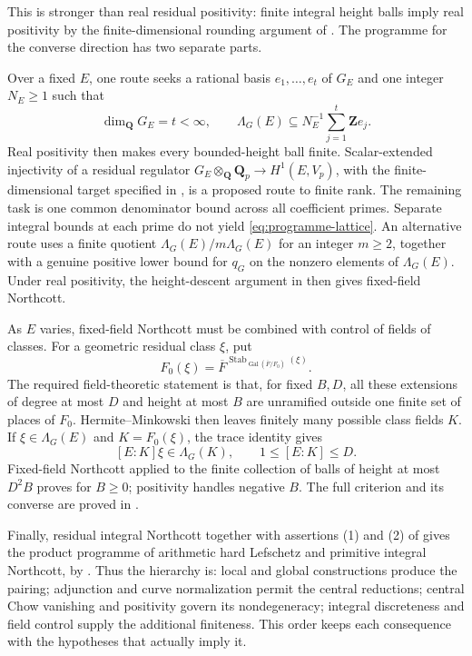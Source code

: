 \documentclass[11pt]{article}
\theoremstyle{definition}
\numberwithin{equation}{section}
\newcommand{\Q}{\mathbf Q}
\begin{document}
This is stronger than real residual positivity: finite integral height balls imply real positivity by the finite-dimensional rounding argument of \cite[Section 5.1]{ArithmeticReductions}. The programme for the converse direction has two separate parts.

Over a fixed $E$, one route seeks a rational basis $e_1,\ldots,e_t$ of $G_E$ and one integer $N_E\ge1$ such that
\begin{equation}\label{eq:programme-lattice}
 \dim_\Q G_E=t<\infty,\qquad
 \Lambda_G(E)\subseteq N_E^{-1}\sum_{j=1}^t\mathbf Z e_j.
\end{equation}
Real positivity then makes every bounded-height ball finite. Scalar-extended injectivity of a residual regulator
$G_E\otimes_\Q\Q_p\to H^1(E,V_p)$, with the finite-dimensional target specified in \cite[Section 3.1]{ArithmeticProgramme}, is a proposed route to finite rank. The remaining task is one common denominator bound across all coefficient primes. Separate integral bounds at each prime do not yield \eqref{eq:programme-lattice}. An alternative route uses a finite quotient $\Lambda_G(E)/m\Lambda_G(E)$ for an integer $m\ge2$, together with a genuine positive lower bound for $q_G$ on the nonzero elements of $\Lambda_G(E)$. Under real positivity, the height-descent argument in \cite[Section 5.4]{ArithmeticReductions} then gives fixed-field Northcott.

As $E$ varies, fixed-field Northcott must be combined with control of fields of classes. For a geometric residual class $\xi$, put
\[
 F_0(\xi)=\overline F^{\operatorname{Stab}_{\operatorname{Gal}(\overline F/F_0)}(\xi)}.
\]
The required field-theoretic statement is that, for fixed $B,D$, all these extensions of degree at most $D$ and height at most $B$ are unramified outside one finite set of places of $F_0$. Hermite--Minkowski then leaves finitely many possible class fields $K$. If $\xi\in\Lambda_G(E)$ and $K=F_0(\xi)$, the trace identity gives
\[
 [E:K]\xi\in\Lambda_G(K),\qquad 1\le [E:K]\le D.
\]
Fixed-field Northcott applied to the finite collection of balls of height at most $D^2B$ proves  for $B\ge0$; positivity handles negative $B$. The full criterion and its converse are proved in \cite[Section 6]{ArithmeticReductions}.

Finally, residual integral Northcott together with assertions (1) and (2) of  gives the product programme of arithmetic hard Lefschetz and primitive integral Northcott, by \cite[Section 7]{ArithmeticReductions}. Thus the hierarchy is: local and global constructions produce the pairing; adjunction and curve normalization permit the central reductions; central Chow vanishing and positivity govern its nondegeneracy; integral discreteness and field control supply the additional finiteness. This order keeps each consequence with the hypotheses that actually imply it.
\end{document}
